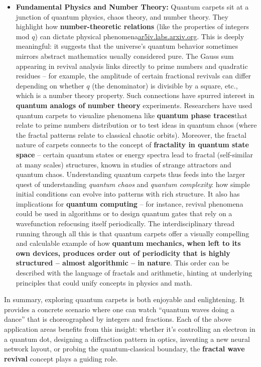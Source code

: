 \documentclass[11pt,a4paper]{article}
\begin{document}
\begin{itemize}
  \item \textbf{Fundamental Physics and Number Theory:} Quantum carpets sit at a junction of quantum physics, chaos theory, and number theory. They highlight how \textbf{number-theoretic relations} (like the properties of integers mod $q$) can dictate physical phenomena\href{https://ar5iv.labs.arxiv.org/html/1808.09708#:~:text=where is called as the,integer and %2C we have}{ar5iv.labs.arxiv.org}. This is deeply meaningful: it suggests that the universe’s quantum behavior sometimes mirrors abstract mathematics usually considered pure. The Gauss sum appearing in revival analysis links directly to prime numbers and quadratic residues – for example, the amplitude of certain fractional revivals can differ depending on whether $q$ (the denominator) is divisible by a square, etc., which is a number theory property. Such connections have spurred interest in \textbf{quantum analogs of number theory} experiments. Researchers have used quantum carpets to visualize phenomena like \textbf{quantum phase traces}that relate to prime numbers distribution or to test ideas in quantum chaos (where the fractal patterns relate to classical chaotic orbits). Moreover, the fractal nature of carpets connects to the concept of \textbf{fractality in quantum state space} – certain quantum states or energy spectra lead to fractal (self-similar at many scales) structures, known in studies of strange attractors and quantum chaos. Understanding quantum carpets thus feeds into the larger quest of understanding \emph{quantum chaos} and \emph{quantum complexity}: how simple initial conditions can evolve into patterns with rich structure. It also has implications for \textbf{quantum computing} – for instance, revival phenomena could be used in algorithms or to design quantum gates that rely on a wavefunction refocusing itself periodically. The interdisciplinary thread running through all this is that quantum carpets offer a visually compelling and calculable example of how \textbf{quantum mechanics, when left to its own devices, produces order out of periodicity that is highly structured – almost algorithmic – in nature}. This order can be described with the language of fractals and arithmetic, hinting at underlying principles that could unify concepts in physics and math.
\end{itemize}

In summary, exploring quantum carpets is both enjoyable and enlightening. It provides a concrete scenario where one can watch “quantum waves doing a dance” that is choreographed by integers and fractions. Each of the above application areas benefits from this insight: whether it’s controlling an electron in a quantum dot, designing a diffraction pattern in optics, inventing a new neural network layout, or probing the quantum-classical boundary, the \textbf{fractal wave revival} concept plays a guiding role.
\end{document}
